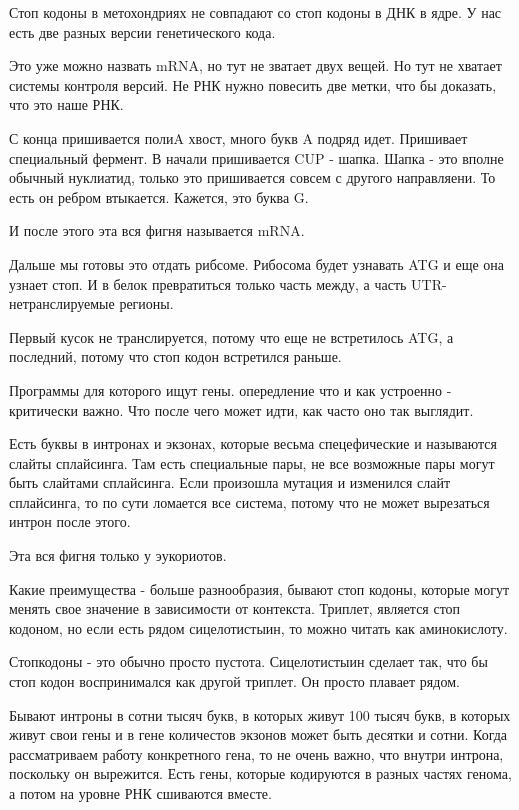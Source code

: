 Стоп кодоны в метохондриях не совпадают 
со стоп кодоны в ДНК в ядре. У нас есть 
две разных версии генетического кода. 

Это уже можно назвать mRNA, но тут не зватает двух вещей. Но тут 
не хватает системы контроля версий. Не РНК нужно повесить две метки, что 
бы доказать, что это наше РНК. 

С конца пришивается полиA хвост, много букв A подряд идет. Пришивает 
специальный фермент. В начали пришивается CUP - шапка. Шапка - это 
вполне обычный нуклиатид, только это пришивается совсем с другого 
направляени. То есть он ребром втыкается. Кажется, это буква G. 

И после этого эта вся фигня называется mRNA. 

Дальше мы готовы это отдать рибсоме. Рибосома будет 
узнавать ATG и еще она узнает стоп. И в белок превратиться только 
часть между, а часть UTR- нетранслируемые регионы. 

Первый кусок не транслируется, потому что еще не встретилось ATG, 
а последний, потому что стоп кодон встретился раньше. 

Программы для которого ищут гены. опередление что и как 
устроенно - критически важно. Что после чего может идти, 
как часто оно так выглядит. 

Есть буквы в интронах и экзонах, которые весьма спецефические и 
называются слайты сплайсинга. Там есть специальные пары, не все возможные 
пары могут быть слайтами сплайсинга. Если произошла мутация и изменился 
слайт сплайсинга, то по сути ломается все система, потому что 
не может вырезаться интрон после этого. 

Эта вся фигня только у эукориотов. 

Какие преимущества - больше разнообразия, 
бывают стоп кодоны, которые могут менять свое значение в зависимости от контекста. 
Триплет, является стоп кодоном, но если есть 
рядом сицелотистыин, то можно читать как аминокислоту. 

Стопкодоны - это обычно просто пустота. Сицелотистыин сделает так, что бы
стоп кодон воспринимался как другой триплет. Он просто плавает рядом. 

Бывают интроны в сотни тысяч букв, в которых живут 100 тысяч букв, в которых 
живут свои гены и в гене количестов экзонов может быть десятки и сотни. Когда рассматриваем 
работу конкретного гена, то не очень важно, что внутри интрона, 
поскольку он вырежится. Есть гены, которые кодируются в разных частях 
генома, а потом на уровне РНК сшиваются вместе. 

